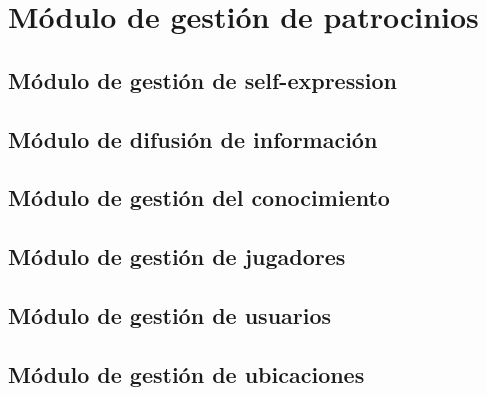 \section{Módulo de gestión de patrocinios}


\clearpage

\subsection{Módulo de gestión de self-expression}


\subsection{Módulo de difusión de información}


\clearpage

\subsection{Módulo de gestión del conocimiento}


\subsection{Módulo de gestión de jugadores}


\subsection{Módulo de gestión de usuarios}


\subsection{Módulo de gestión de ubicaciones}

